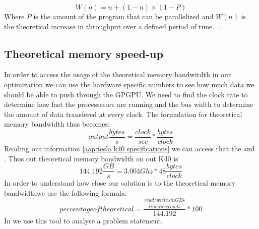 \begin{equation}
  \label{eq:gustafson-barsis law}
  W(n) = n + (1-n) \times (1-P)
\end{equation}
Where $P$ is the amount of the program that can be parallelized and $W(n)$ is the theoretical increase in throughput over a defined period of time.~\cite{gustafson1988reevaluating}.

\subsection{Theoretical memory speed-up}
\label{sec:analysing hardware}
In order to access the usage of the theoretical memory bandwitdth in our optimization we can use the hardware specific numbers to see how much data we should be able to push through the GPGPU.
We need to find the clock rate to determine how fast the processesors are running and the bus width to determine the amount of data transfered at every clock.
The formulation for theoretical memory bandwidth thus becomes:
\begin{equation*}
output \frac{bytes}{s} = \frac{clock}{sec} * \frac{bytes}{clock}
\end{equation*}
Reading out  information \cref{aap:tesla k40 specifications} we can access that the  and .
Thus out theoretical memory bandwidth on out K40 is
\begin{equation*}
144.192 \frac{GB}{s} = 3.004 Ghz * 48 \frac{bytes}{clock}
\end{equation*}
In order to understand how close our solution is to the theoretical memory bandwidthwe use the following formula:
\begin{equation*}
percentage of theoretical = \frac{\frac{read/writes in GBs}{time in seconds}}{144.192} * 100
\end{equation*}
In  we use this tool to analyse a problem statement.
